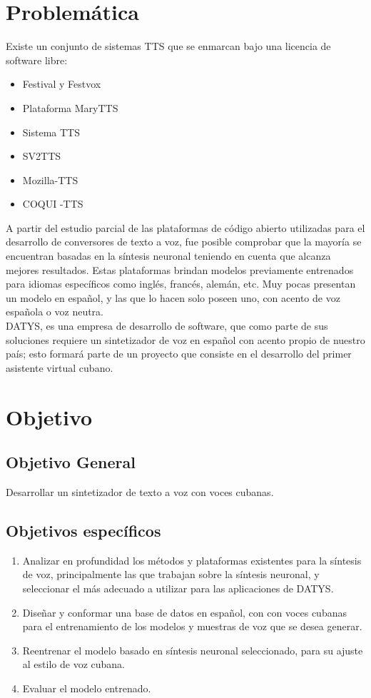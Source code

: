 \section*{Problemática}
Existe un conjunto de sistemas TTS que se enmarcan bajo una licencia de software libre:
\begin{itemize}
	\item Festival y Festvox
	\item Plataforma MaryTTS
	\item Sistema TTS
	\item SV2TTS
	\item Mozilla-TTS
	\item COQUI -TTS
\end{itemize}


A partir del estudio parcial de las plataformas de código abierto utilizadas para el desarrollo de conversores de texto a voz, fue posible comprobar que la mayoría se encuentran basadas en la síntesis neuronal teniendo en cuenta que alcanza mejores resultados. Estas plataformas brindan modelos previamente entrenados para idiomas específicos como inglés, francés, alemán, etc. Muy pocas presentan un modelo en español, y las que lo hacen solo poseen uno, con acento de voz española o voz neutra.\\

DATYS, es una empresa de desarrollo de software, que como parte de sus soluciones requiere un sintetizador de voz en español con acento propio de nuestro país; esto formará parte de un proyecto que consiste en el desarrollo del primer asistente virtual cubano. 

\section*{Objetivo}

\subsection*{Objetivo General}

Desarrollar un sintetizador de texto a voz con voces cubanas.

\subsection*{Objetivos específicos}
\begin{enumerate}
	\item Analizar en profundidad los métodos y plataformas existentes para la síntesis de voz, principalmente las que trabajan sobre la síntesis neuronal, y seleccionar el más adecuado a utilizar para las aplicaciones de DATYS.
	\item Diseñar y conformar una base de datos en español, con con voces cubanas para el entrenamiento de los modelos y muestras de voz que se desea generar.
	\item Reentrenar el modelo basado en síntesis neuronal seleccionado, para su ajuste al estilo de voz cubana.
	\item Evaluar el modelo entrenado.
\end{enumerate}